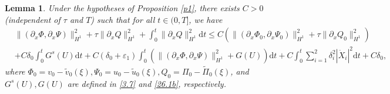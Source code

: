 \documentclass[10pt,a4paper]{amsart}
\newtheorem{lemma}{Lemma}
\newcommand{\dif}{\mathrm{d}}
\begin{document}
\begin{lemma}\label{Le4.7}
Under the hypotheses of Proposition \ref{p1}, there exists $C>0$ (independent of $\tau$ and $T$) such that for all $t\in(0,T]$, we have
\begin{equation}\label{26.2}
\begin{aligned}
&\|\left(\partial_{x}\Phi, \partial_{x}\Psi\right)\|_{H^1}^2
+\tau\|\partial_{x}Q\|_{H^1}^2
+\int_0^t\|\partial_{x}Q\|_{H^1}^2\dif t\leq
C(\|\left(\partial_{x}\Phi_0, \partial_{x}\Psi_0\right)\|_{H^1}^2
+\tau\|\partial_{x}Q_0\|_{H^1}^2)\\
 &+C\delta_0\int_0^tG^s(U)\dif t
+C(\delta_0+\varepsilon_1)\int_0^t\left(\|\left(\partial_{x}\Phi, \partial_{x}\Psi\right)\|_{H^1}^2+G(U)\right)\dif t
+C\int_0^t\sum\limits_{i=1}^2\delta_i^2|\dot{X}_i|^2\dif t
+C\delta_0,
\end{aligned}
\end{equation}
where $\Phi_0=v_0-\widetilde{v}_0(\xi), \Psi_0=u_0-\widetilde{u}_0(\xi), Q_0=\Pi_0-\widetilde{\Pi}_0(\xi)$, and $G^s(U), G(U)$ are defined in \eqref{3.7} and \eqref{26.1b}, respectively.
\end{lemma}
\end{document}
